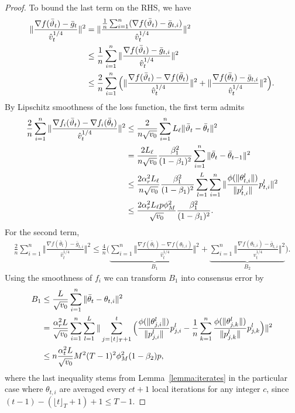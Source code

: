 \documentclass[nohyperref]{article}
\begin{document}
\begin{proof}
\newpage

To bound the last term on the RHS, we have
\begin{align}\notag
    \Vert \frac{\nabla f(\bar\vartheta_t)-\bar g_t }{\hat v_t^{1/4}}\Vert^2&=\Vert \frac{\frac{1}{n}\sum_{i=1}^n (\nabla f(\bar\vartheta_t)-\bar g_{t,i})}{\hat v_t^{1/4}} \Vert^2\\\notag
    &\leq \frac{1}{n}\sum_{i=1}^n\Vert \frac{\nabla f(\bar\vartheta_t)-\bar g_{t,i}}{\hat v_t^{1/4}} \Vert^2\\\notag
    &\leq \frac{2}{n}\sum_{i=1}^n \Big(\Vert \frac{\nabla f(\bar\vartheta_t)-\nabla f(\bar\theta_t)}{\hat v_t^{1/4}} \Vert^2+\Vert \frac{\nabla f(\bar\theta_t)-\bar g_{t,i}}{\hat v_t^{1/4}} \Vert^2  \Big). 
\end{align}
By Lipschitz smoothness of the loss function, the first term admits
\begin{align}\notag
    \frac{2}{n}\sum_{i=1}^n\Vert \frac{\nabla f_i(\bar\vartheta_t)-\nabla f_i(\bar\theta_t)}{\hat v_t^{1/4}} \Vert^2&\leq \frac{2}{n \sqrt{v_0}}\sum_{i=1}^n L_\ell\Vert \bar\vartheta_t-\bar\theta_t\Vert^2  \\\notag
    &=\frac{2L_\ell}{n \sqrt{v_0}}\frac{\beta_1^2}{(1-\beta_1)^2}\sum_{i=1}^n \Vert \bar\theta_t-\bar\theta_{t-1}\Vert ^2\\\notag
    &\leq \frac{2\alpha_r^2 L_\ell }{n \sqrt{v_0}}\frac{\beta_1^2}{(1-\beta_1)^2} \sum_{l=1}^L \sum_{i=1}^n\Vert \frac{\phi(\Vert \theta_{t,i}^l\Vert)}{\Vert p_{t,i}^l\Vert}p_{t,i}^l \Vert^2\\\notag
    &\leq \frac{2\alpha_r^2 L_\ell p\phi_M^2}{ \sqrt{v_0}}\frac{\beta_1^2}{(1-\beta_1)^2}.
\end{align}
For the second term,
\begin{align}\label{eq:inter}
    \frac{2}{n}\sum_{i=1}^n\Vert \frac{\nabla f(\bar\theta_t)-\bar g_{t,i}}{\hat v_t^{1/4}} \Vert^2 \leq \frac{4}{n}\Big( \underbrace{\sum_{i=1}^n \Vert \frac{\nabla f(\bar\theta_t)-\nabla f(\theta_{t,i})}{\hat v_t^{1/4}} \Vert^2}_{B_1} + \underbrace{ \sum_{i=1}^n\Vert \frac{\nabla f(\theta_{t,i})-\bar g_{t,i}}{\hat v_t^{1/4}} \Vert^2}_{B_2} \Big).
\end{align}
Using the smoothness of $f_i$ we can transform $B_1$ into consensus error by
\begin{align}\notag
    B_1&\leq \frac{L}{\sqrt{v_0}}\sum_{i=1}^n \Vert \bar\theta_t - \theta_{t,i}\Vert^2  \label{eqn:B1}\\
    &=\frac{\alpha_r^2 L}{\sqrt{v_0}}\sum_{i=1}^n\sum_{l=1}^L \| \sum_{j=\lfloor t \rfloor_T+1}^t \Big( \frac{\phi(\Vert \theta_{j,i}^l\Vert)}{\Vert p_{j,i}^l\Vert}p_{j,i}^l-\frac{1}{n}\sum_{k=1}^n \frac{\phi(\Vert \theta_{j,k}^l\Vert)}{\Vert p_{j,k}^l\Vert}p_{j,k}^l \Big) \|^2\\\notag
    &\leq n \frac{\alpha_t^2 L}{\sqrt{v_0}} M^2 (T-1)^2 \phi_M^2 (1-\beta_2)p,
\end{align}
where the last inequality stems from Lemma~\ref{lemma:iterates} in the particular case where $  \theta_{t,i}$ are averaged every $ct+1$ local iterations for any integer $c$, since $(t-1)-(\lfloor t \rfloor_T+1)+1 \leq T-1$.



\end{proof}
\end{document}
